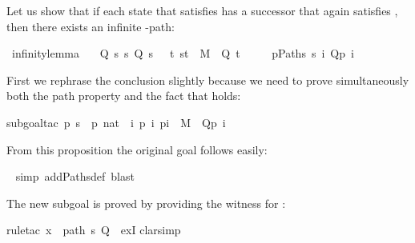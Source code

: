 \begin{isabellebody}
\begin{isamarkuptext}
Let us show that if each state  that satisfies 
has a successor that again satisfies , then there exists an infinite -path:%
\end{isamarkuptext}%
\isamarkuptrue%
\ infinity{\isacharunderscore}lemma{\isacharcolon}\isanewline
\ \ {\isachardoublequote}{\isasymlbrakk}\ Q\ s{\isacharsemicolon}\ {\isasymforall}s{\isachardot}\ Q\ s\ {\isasymlongrightarrow}\ {\isacharparenleft}{\isasymexists}\ t{\isachardot}\ {\isacharparenleft}s{\isacharcomma}t{\isacharparenright}\ {\isasymin}\ M\ {\isasymand}\ Q\ t{\isacharparenright}\ {\isasymrbrakk}\ {\isasymLongrightarrow}\isanewline
\ \ \ {\isasymexists}p{\isasymin}Paths\ s{\isachardot}\ {\isasymforall}i{\isachardot}\ Q{\isacharparenleft}p\ i{\isacharparenright}{\isachardoublequote}\isamarkupfalse%
%
\begin{isamarkuptxt}%
\noindent
First we rephrase the conclusion slightly because we need to prove simultaneously
both the path property and the fact that  holds:%
\end{isamarkuptxt}%
\isamarkuptrue%
subgoal{\isacharunderscore}tac\ {\isachardoublequote}{\isasymexists}p{\isachardot}\ s\ {\isacharequal}\ p\ {\isacharparenleft}{}{\isacharcolon}{\isacharcolon}nat{\isacharparenright}\ {\isasymand}\ {\isacharparenleft}{\isasymforall}i{\isachardot}\ {\isacharparenleft}p\ i{\isacharcomma}\ p{\isacharparenleft}i{\isacharplus}{}{\isacharparenright}{\isacharparenright}\ {\isasymin}\ M\ {\isasymand}\ Q{\isacharparenleft}p\ i{\isacharparenright}{\isacharparenright}{\isachardoublequote}{\isacharparenright}\isamarkupfalse%
%
\begin{isamarkuptxt}%
\noindent
From this proposition the original goal follows easily:%
\end{isamarkuptxt}%
\ \isamarkuptrue%
simp\ add{\isacharcolon}Paths{\isacharunderscore}def{\isacharcomma}\ blast{\isacharparenright}\isamarkupfalse%
%
\begin{isamarkuptxt}%
\noindent
The new subgoal is proved by providing the witness  for :%
\end{isamarkuptxt}%
\isamarkuptrue%
rule{\isacharunderscore}tac\ x\ {\isacharequal}\ {\isachardoublequote}path\ s\ Q{\isachardoublequote}\ \ exI{\isacharparenright}\isanewline
\isamarkupfalse%
clarsimp{\isacharparenright}\isamarkupfalse%
%
\begin{isamarkuptxt}%

\end{isamarkuptxt}
\end{isabellebody}
